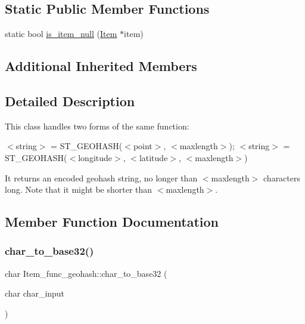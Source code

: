 \subsection*{Static Public Member Functions}
\begin{DoxyCompactItemize}
\item 
static bool \mbox{\hyperlink{classItem__func__geohash_af84e272abb84634d9ad7375602ce462f}{is\+\_\+item\+\_\+null}} (\mbox{\hyperlink{classItem}{Item}} $\ast$item)
\end{DoxyCompactItemize}
\subsection*{Additional Inherited Members}


\subsection{Detailed Description}
This class handles two forms of the same function\+:

$<$string$>$ = S\+T\+\_\+\+G\+E\+O\+H\+A\+S\+H($<$point$>$, $<$maxlength$>$); $<$string$>$ = S\+T\+\_\+\+G\+E\+O\+H\+A\+S\+H($<$longitude$>$, $<$latitude$>$, $<$maxlength$>$)

It returns an encoded geohash string, no longer than $<$maxlength$>$ characters long. Note that it might be shorter than $<$maxlength$>$. 

\subsection{Member Function Documentation}
\mbox{\label{classItem__func__geohash_a1fbadf1b1b984bba02477c0c25c39aea}} 
\subsubsection{\texorpdfstring{char\+\_\+to\+\_\+base32()}{char\_to\_base32()}}
{\footnotesize\ttfamily char Item\+\_\+func\+\_\+geohash\+::char\+\_\+to\+\_\+base32 (\begin{DoxyParamCaption}\item[{char}]{char\+\_\+input }\end{DoxyParamCaption})}

